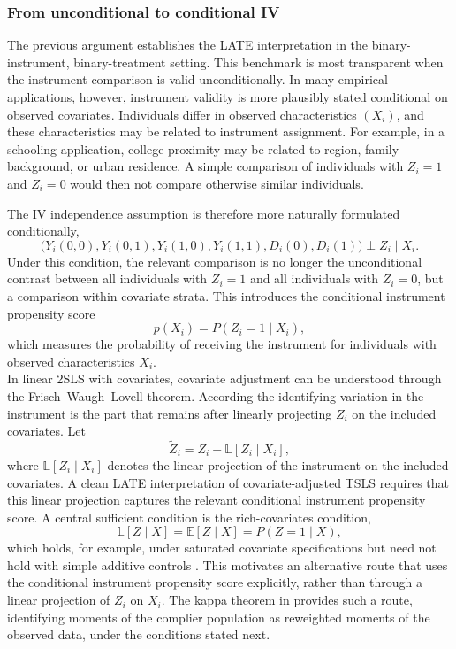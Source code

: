 \documentclass[12pt, a4paper, oneside]{article}
\theoremstyle{plain}
\theoremstyle{definition}
\begin{document}
\subsubsection{From unconditional to conditional IV}

The previous argument establishes the LATE interpretation in the binary-instrument, binary-treatment setting. This benchmark is most transparent when the instrument comparison is valid unconditionally. In many empirical applications, however, instrument validity is more plausibly stated conditional on observed covariates. Individuals differ in observed characteristics $(X_i)$, and these characteristics may be related to instrument assignment. For example, in a schooling application, college proximity may be related to region, family background, or urban residence. A simple comparison of individuals with $Z_i=1$ and $Z_i=0$ would then not compare otherwise similar individuals.

The IV independence assumption is therefore more naturally formulated conditionally,
\begin{equation}
\big(Y_i(0,0),Y_i(0,1),Y_i(1,0),Y_i(1,1),D_i(0),D_i(1)\big)
\perp Z_i \mid X_i .
\end{equation}
Under this condition, the relevant comparison is no longer the unconditional contrast between all individuals with $Z_i=1$ and all individuals with $Z_i=0$, but a comparison within covariate strata. This introduces the conditional instrument propensity score
\begin{equation}
    p(X_i)=P(Z_i=1\mid X_i),
\end{equation}
which measures the probability of receiving the instrument for individuals with observed characteristics $X_i$.\\
In linear 2SLS with covariates, covariate adjustment can be understood through the
Frisch--Waugh--Lovell theorem. According the identifying variation in the instrument is the part
that remains after linearly projecting \(Z_i\) on the included covariates. Let
\begin{equation}
    \tilde Z_i = Z_i - \mathbb{L}[Z_i\mid X_i],
\end{equation}
where \(\mathbb{L}[Z_i\mid X_i]\) denotes the linear projection of the instrument on the
included covariates. A clean LATE interpretation of covariate-adjusted TSLS requires that this linear projection
captures the relevant conditional instrument propensity score. A central sufficient condition
is the rich-covariates condition,
\begin{equation}
    \mathbb{L}[Z\mid X] = \mathbb{E}[Z\mid X] = P(Z=1\mid X),
\end{equation}
which holds, for example, under saturated covariate specifications but need not hold with
simple additive controls \citep{blandhol2022tsls}.
This motivates an alternative route that uses the conditional instrument propensity score explicitly, rather than through a linear projection of $Z_i$ on $X_i$. The kappa theorem in \citet{abadie2003semiparametric} provides such a route, identifying moments of the complier population as reweighted moments of the observed data, under the conditions stated next.
\end{document}
